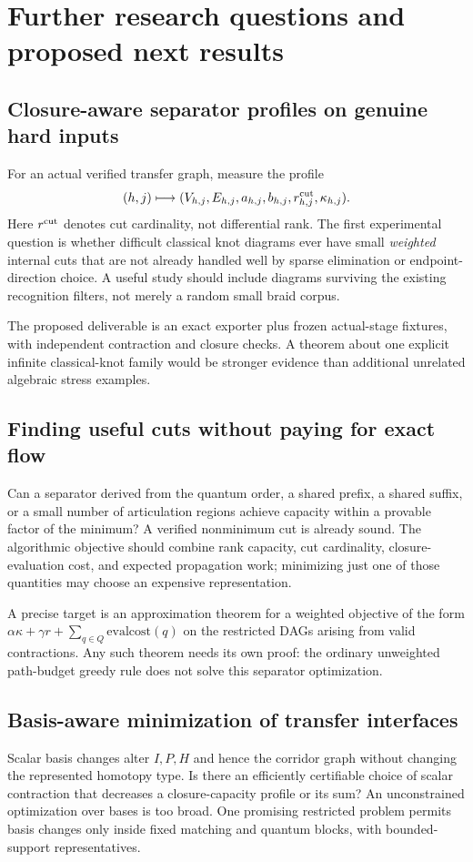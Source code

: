 \documentclass[11pt,letterpaper]{article}
\theoremstyle{definition}\newtheorem{definition}[theorem]{Definition}
\theoremstyle{remark}\newtheorem{remark}[theorem]{Remark}
\begin{document}
\section{Further research questions and proposed next results}
\subsection{Closure-aware separator profiles on genuine hard inputs}
For an actual verified transfer graph, measure the profile
\[
(h,j)\longmapsto (V_{h,j},E_{h,j},a_{h,j},b_{h,j},r_{h,j}^{\rm cut},\kappa_{h,j}).
\]
Here $r^{\rm cut}$ denotes cut cardinality, not differential rank. The first
experimental question is whether difficult classical knot diagrams ever
have small \emph{weighted} internal cuts that are not already handled well
by sparse elimination or endpoint-direction choice. A useful study should
include diagrams surviving the existing recognition filters, not merely a
random small braid corpus.

The proposed deliverable is an exact exporter plus frozen actual-stage
fixtures, with independent contraction and closure checks. A theorem about
one explicit infinite classical-knot family would be stronger evidence than
additional unrelated algebraic stress examples.

\subsection{Finding useful cuts without paying for exact flow}
Can a separator derived from the quantum order, a shared prefix, a shared
suffix, or a small number of articulation regions achieve capacity within a
provable factor of the minimum? A verified nonminimum cut is already sound.
The algorithmic objective should combine rank capacity, cut cardinality,
closure-evaluation cost, and expected propagation work; minimizing just one
of those quantities may choose an expensive representation.

A precise target is an approximation theorem for a weighted objective of
the form $\alpha\kappa+\gamma r+\sum_{q\in Q}\mathrm{evalcost}(q)$ on the
restricted DAGs arising from valid contractions. Any such theorem needs its
own proof: the ordinary unweighted path-budget greedy rule does not solve
this separator optimization.

\subsection{Basis-aware minimization of transfer interfaces}
Scalar basis changes alter $I,P,H$ and hence the corridor graph without
changing the represented homotopy type. Is there an efficiently certifiable
choice of scalar contraction that decreases a closure-capacity profile or
its sum? An unconstrained optimization over bases is too broad. One promising
restricted problem permits basis changes only inside fixed matching and
quantum blocks, with bounded-support representatives.
\end{document}
